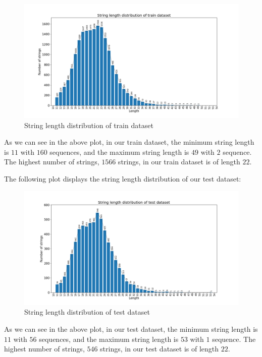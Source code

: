 \begin{figure}[h]
    \centering
    \includegraphics[width=0.9\linewidth]{images/dataset/train_dataset_string_len.png}
    \caption[String length distribution of train dataset]{String length distribution of train dataset}
    \label{fig:train_string_len}
\end{figure}

As we can see in the above plot, in our train dataset, the minimum string length is $11$ with $160$ sequences, and the maximum string length is $49$ with $2$ sequence. The highest number of strings, $1566$ strings, in our train dataset is of length $22$.

The following plot displays the string length distribution of our test dataset:

\begin{figure}[h]
    \centering
    \includegraphics[width=0.9\linewidth]{images/dataset/test_dataset_string_len.png}
    \caption[String length distribution of test dataset]{String length distribution of test dataset}
    \label{fig:test_string_len}
\end{figure}

As we can see in the above plot, in our test dataset, the minimum string length is $11$ with $56$ sequences, and the maximum string length is $53$ with $1$ sequence. The highest number of strings, $546$ strings, in our test dataset is of length $22$.
